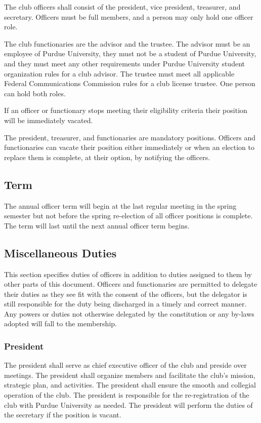 \documentclass{article}
\begin{document}
The club officers shall consist of the president, vice president, treasurer, and
secretary. Officers must be full members, and a person may only hold one officer
role.

The club functionaries are the advisor and the trustee. The advisor must be an
employee of Purdue University, they must not be a student of Purdue University,
and they must meet any other requirements under Purdue University student
organization rules for a club advisor. The trustee must meet all applicable
Federal Communications Commission rules for a club license trustee. One person
can hold both roles.

If an officer or functionary stops meeting their eligibility criteria their
position will be immediately vacated.

The president, treasurer, and functionaries are mandatory positions. Officers
and functionaries can vacate their position either immediately or when an
election to replace them is complete, at their option, by notifying the
officers.

\subsection{Term}

The annual officer term will begin at the last regular meeting in the spring
semester but not before the spring re-election of all officer positions is
complete. The term will last until the next annual officer term begins.

\subsection{Miscellaneous Duties}

This section specifies duties of officers in addition to duties assigned to them
by other parts of this document. Officers and functionaries are permitted to
delegate their duties as they see fit with the consent of the officers, but the
delegator is still responsible for the duty being discharged in a timely and
correct manner. Any powers or duties not otherwise delegated by the constitution
or any by-laws adopted will fall to the membership.

\subsubsection{President}

The president shall serve as chief executive officer of the club and preside
over meetings. The president shall organize members and facilitate the club's
mission, strategic plan, and activities. The president shall ensure the smooth
and collegial operation of the club. The president is responsible for the
re-registration of the club with Purdue University as needed. The president will
perform the duties of the secretary if the position is vacant.
\end{document}
